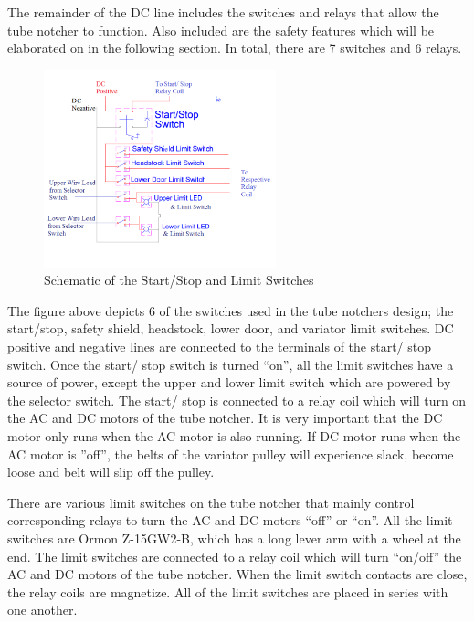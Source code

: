 \newpage
The remainder of the DC line includes the switches and relays that allow the tube notcher to function. Also included are the safety features which will be elaborated on in the following section. In total, there are 7 switches and 6 relays.

\begin{figure}[H]
    \centering
    \includegraphics[width=0.6\textwidth]{./fall-report pictures/Chapter2-MachineDescription/Switches}
    \caption{Schematic of the Start/Stop and Limit Switches}
    \label{fig:Electrical:Switches}
\end{figure} 

The figure above depicts 6 of the switches used in the tube notchers design; the start/stop, safety shield, headstock, lower door, and variator limit switches. DC positive and negative lines are connected to the terminals of the start/ stop switch. Once the start/ stop switch is turned ``on'', all the limit switches have a source of power, except the upper and lower limit switch which are powered by the selector switch. The start/ stop is connected to a relay coil which will turn on the AC and DC motors of the tube notcher. It is very important that the DC motor only runs when the AC motor is also running. If DC motor runs when the AC motor is ”off”, the belts of the variator pulley will experience slack, become loose and belt will slip off the pulley.

There are various limit switches on the tube notcher that mainly control corresponding relays to turn the AC and DC motors ``off'' or ``on''. All the limit switches are Ormon Z-15GW2-B, which has a long lever arm with a wheel at the end. The limit switches are connected to a relay coil which will turn ``on/off'' the AC and DC motors of the tube notcher. When the limit switch contacts are close, the relay coils are magnetize. All of the limit switches are placed in series with one another. 

